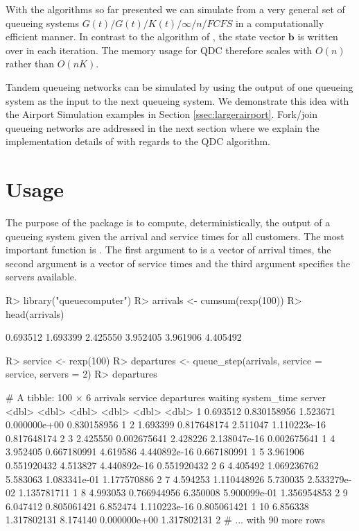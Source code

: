 \documentclass[article]{jss}
\begin{document}
With the algorithms so far presented we can simulate from a very general set of queueing systems $G(t)/G(t)/K(t)/\infty/n/FCFS$ in a computationally efficient manner. In contrast to the algorithm of \cite{kin_generalized_2010}, the state vector $\mathbf{b}$ is written over in each iteration. The memory usage for QDC therefore scales with $O(n)$ rather than $O(nK)$. 

Tandem queueing networks can be simulated by using the output of one queueing system as the input to the next queueing system. We demonstrate this idea with the Airport Simulation examples in Section \ref{ssec:largerairport}. Fork/join queueing networks are addressed in the next section where we explain the implementation details of  with regards to the QDC algorithm.  

\newpage

\section{Usage} \label{sec:usage}

The purpose of the package  is to compute, deterministically, the output of a queueing system given the arrival and service times for all customers. The most important function is . The first argument to   is a vector of arrival times, the second argument is a vector of service times and the third argument specifies the servers available. 

\begin{CodeChunk}
\begin{Sinput}
R> library("queuecomputer")
R> arrivals <- cumsum(rexp(100))
R> head(arrivals)
\end{Sinput}
\begin{Soutput}
[1] 0.693512 1.693399 2.425550 3.952405 3.961906 4.405492
\end{Soutput}
\begin{Sinput}
R> service <- rexp(100)
R> departures <- queue_step(arrivals, service = service, servers = 2)
R> departures
\end{Sinput}
\begin{Soutput}
# A tibble: 100 × 6
   arrivals     service departures      waiting system_time server
      <dbl>       <dbl>      <dbl>        <dbl>       <dbl>  <dbl>
1  0.693512 0.830158956   1.523671 0.000000e+00 0.830158956      1
2  1.693399 0.817648174   2.511047 1.110223e-16 0.817648174      2
3  2.425550 0.002675641   2.428226 2.138047e-16 0.002675641      1
4  3.952405 0.667180991   4.619586 4.440892e-16 0.667180991      1
5  3.961906 0.551920432   4.513827 4.440892e-16 0.551920432      2
6  4.405492 1.069236762   5.583063 1.083341e-01 1.177570886      2
7  4.594253 1.110448926   5.730035 2.533279e-02 1.135781711      1
8  4.993053 0.766944956   6.350008 5.900099e-01 1.356954853      2
9  6.047412 0.805061421   6.852474 1.110223e-16 0.805061421      1
10 6.856338 1.317802131   8.174140 0.000000e+00 1.317802131      2
# ... with 90 more rows
\end{Soutput}
\end{CodeChunk}
\end{document}
